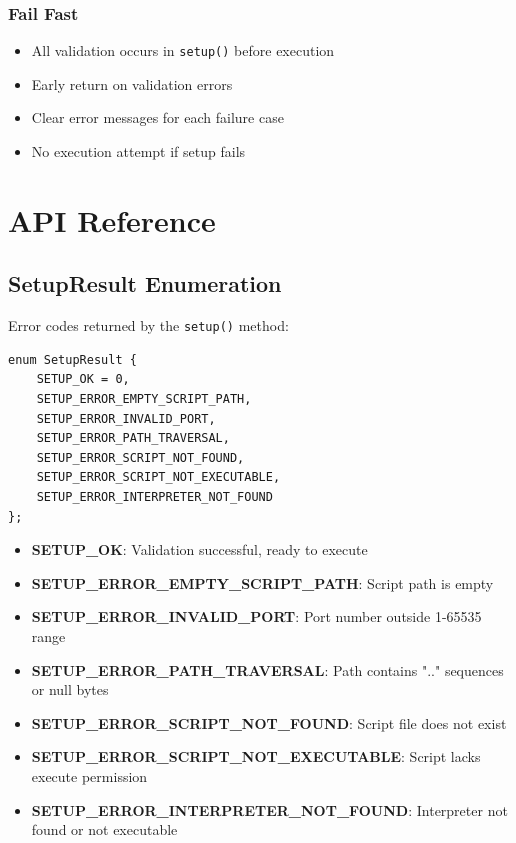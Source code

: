 \documentclass[11pt,a4paper]{article}
\begin{document}
\subsubsection{Fail Fast}

\begin{itemize}
    \item All validation occurs in \texttt{setup()} before execution
    \item Early return on validation errors
    \item Clear error messages for each failure case
    \item No execution attempt if setup fails
\end{itemize}

\newpage
\section{API Reference}

\subsection{SetupResult Enumeration}

Error codes returned by the \texttt{setup()} method:

\begin{lstlisting}[caption=SetupResult Enum]
enum SetupResult {
    SETUP_OK = 0,
    SETUP_ERROR_EMPTY_SCRIPT_PATH,
    SETUP_ERROR_INVALID_PORT,
    SETUP_ERROR_PATH_TRAVERSAL,
    SETUP_ERROR_SCRIPT_NOT_FOUND,
    SETUP_ERROR_SCRIPT_NOT_EXECUTABLE,
    SETUP_ERROR_INTERPRETER_NOT_FOUND
};
\end{lstlisting}

\begin{itemize}
    \item \textbf{SETUP\_OK}: Validation successful, ready to execute
    \item \textbf{SETUP\_ERROR\_EMPTY\_SCRIPT\_PATH}: Script path is empty
    \item \textbf{SETUP\_ERROR\_INVALID\_PORT}: Port number outside 1-65535 range
    \item \textbf{SETUP\_ERROR\_PATH\_TRAVERSAL}: Path contains ".." sequences or null bytes
    \item \textbf{SETUP\_ERROR\_SCRIPT\_NOT\_FOUND}: Script file does not exist
    \item \textbf{SETUP\_ERROR\_SCRIPT\_NOT\_EXECUTABLE}: Script lacks execute permission
    \item \textbf{SETUP\_ERROR\_INTERPRETER\_NOT\_FOUND}: Interpreter not found or not executable
\end{itemize}
\end{document}

